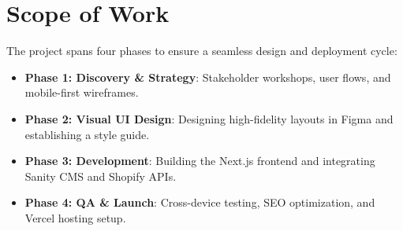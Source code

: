 \section{Scope of Work}
The project spans four phases to ensure a seamless design and deployment cycle:
\begin{itemize}
    \item \textbf{Phase 1: Discovery \& Strategy}: Stakeholder workshops, user flows, and mobile-first wireframes.
    \item \textbf{Phase 2: Visual UI Design}: Designing high-fidelity layouts in Figma and establishing a style guide.
    \item \textbf{Phase 3: Development}: Building the Next.js frontend and integrating Sanity CMS and Shopify APIs.
    \item \textbf{Phase 4: QA \& Launch}: Cross-device testing, SEO optimization, and Vercel hosting setup.
\end{itemize}

\newpage %


